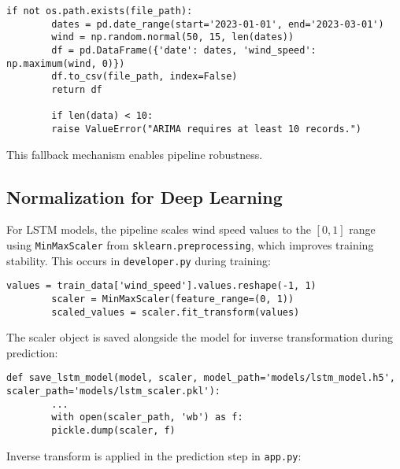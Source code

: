 \lstset{breaklines=true}
\begin{framed}
	\begin{lstlisting}[basicstyle=\ttfamily\small]
		if not os.path.exists(file_path):
		dates = pd.date_range(start='2023-01-01', end='2023-03-01')
		wind = np.random.normal(50, 15, len(dates))
		df = pd.DataFrame({'date': dates, 'wind_speed': np.maximum(wind, 0)})
		df.to_csv(file_path, index=False)
		return df
		
		if len(data) < 10:
		raise ValueError("ARIMA requires at least 10 records.")
	\end{lstlisting}
\end{framed}


This fallback mechanism enables pipeline robustness.

\subsection{Normalization for Deep Learning}

For LSTM models, the pipeline scales wind speed values to the \([0,1]\) range using \texttt{MinMaxScaler} from \texttt{sklearn.preprocessing}, which improves training stability. This occurs in \texttt{developer.py} during training:

\lstset{breaklines=true}
\begin{framed}
	\begin{lstlisting}[basicstyle=\ttfamily\small]
		values = train_data['wind_speed'].values.reshape(-1, 1)
		scaler = MinMaxScaler(feature_range=(0, 1))
		scaled_values = scaler.fit_transform(values)
	\end{lstlisting}
\end{framed}


The scaler object is saved alongside the model for inverse transformation during prediction:

\lstset{breaklines=true}
\begin{framed}
	\begin{lstlisting}[basicstyle=\ttfamily\small]
		def save_lstm_model(model, scaler, model_path='models/lstm_model.h5', scaler_path='models/lstm_scaler.pkl'):
		...
		with open(scaler_path, 'wb') as f:
		pickle.dump(scaler, f)
	\end{lstlisting}
\end{framed}


Inverse transform is applied in the prediction step in \texttt{app.py}:


\lstset{
	breaklines=true,
	breakatwhitespace=true,
	basicstyle=\ttfamily\footnotesize
}

